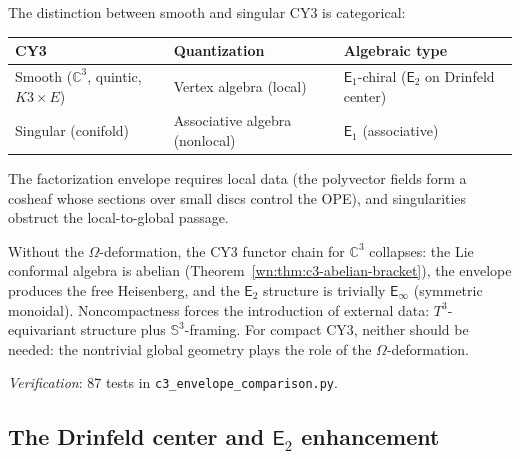 \documentclass[11pt]{article}
\newcommand{\C}{\mathbb{C}}
\newcommand{\bS}{\mathbb{S}}
\newcommand{\Eone}{\mathsf{E}_1}
\newcommand{\Etwo}{\mathsf{E}_2}
\newcommand{\Einf}{\mathsf{E}_{\infty}}
\begin{document}
\begin{remark}
\label{wn:rem:smooth-singular-locality}
The distinction between smooth and singular CY3 is categorical:
\begin{center}
\renewcommand{\arraystretch}{1.2}
\begin{tabular}{lll}
 \toprule
 \textbf{CY3} & \textbf{Quantization} & \textbf{Algebraic type} \\
 \midrule
 Smooth ($\C^3$, quintic, $K3 \times E$) & Vertex algebra (local) & $\Eone$-chiral ($\Etwo$ on Drinfeld center) \\
 Singular (conifold) & Associative algebra (nonlocal) & $\Eone$ (associative) \\
 \bottomrule
\end{tabular}
\end{center}
The factorization envelope requires local data (the polyvector fields form a cosheaf whose sections over small discs control the OPE), and singularities obstruct the local-to-global passage.
\end{remark}

\begin{proposition}
\label{wn:prop:omega-necessary}
Without the $\Omega$-deformation, the CY3 functor chain for $\C^3$ collapses: the Lie conformal algebra is abelian (Theorem~\ref{wn:thm:c3-abelian-bracket}), the envelope produces the free Heisenberg, and the $\Etwo$ structure is trivially $\Einf$ (symmetric monoidal). Noncompactness forces the introduction of external data: $T^3$-equivariant structure plus $\bS^3$-framing. For compact CY3, neither should be needed: the nontrivial global geometry plays the role of the $\Omega$-deformation.

\noindent\textit{Verification}: 87 tests in \texttt{c3\_envelope\_comparison.py}.
\end{proposition}

\subsection{The Drinfeld center and $\Etwo$ enhancement}
\label{subsec:c3-drinfeld-center}
\end{document}

